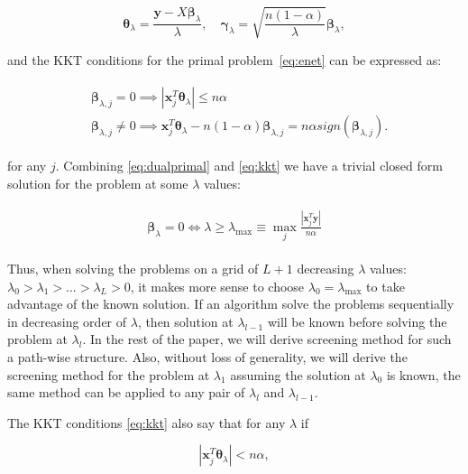\begin{equation}
    \label{eq:dualprimal}
    \boldsymbol\theta_\lambda=\frac{\boldsymbol y-X\boldsymbol\beta_\lambda}{\lambda},\quad \boldsymbol\gamma_\lambda=\sqrt{\frac{n(1-\alpha)}{\lambda}}\boldsymbol\beta_\lambda,
\end{equation}

and the KKT conditions for the primal problem~\eqref{eq:enet} can be expressed as:

\begin{gather}
    \label{eq:kkt}
    \begin{aligned}&\boldsymbol\beta_{\lambda,j}=0\implies|\boldsymbol x_j^T\boldsymbol\theta_\lambda|\leq n\alpha\\
    & \boldsymbol\beta_{\lambda,j}\neq0\implies  \boldsymbol x_j^T\boldsymbol\theta_\lambda-n(1-\alpha)\boldsymbol\beta_{\lambda,j}=n\alpha\textit{sign}(\boldsymbol\beta_{\lambda,j}).
    \end{aligned}
\end{gather}

for any $j$. Combining \eqref{eq:dualprimal} and \eqref{eq:kkt} we have a trivial closed form solution for the problem at some $\lambda$ values:

\begin{gather}
    \label{eq:lammax}
    \begin{aligned}
        \boldsymbol\beta_\lambda=0\iff \lambda \geq \lambda_{\max}\equiv \max_j \frac{|\boldsymbol x_j^T\boldsymbol y|}{n\alpha}
    \end{aligned}
\end{gather}

Thus, when solving the problems on a grid of $L+1$ decreasing $\lambda$ values: $\lambda_0>\lambda_1>...>\lambda_L>0$, it makes more sense to choose $\lambda_0= \lambda_{\max}$ to take advantage of the known solution. If an algorithm solve the problems sequentially in decreasing order of $\lambda$, then solution at $\lambda_{l-1}$ will be known before solving the problem at $\lambda_l$. In the rest of the paper, we will derive screening method for such a path-wise structure. Also, without loss of generality, we will derive the screening method for the problem at $\lambda_1$ assuming the solution at $\lambda_0$ is known, the same method can be applied to any pair of $\lambda_{l}$ and $\lambda_{l-1}$.

The KKT conditions \eqref{eq:kkt} also say that for any $\lambda$ if 

\begin{equation}
    \label{eq:disc_cond}
    |\boldsymbol x_j^T\boldsymbol\theta_{\lambda}|<n\alpha,
\end{equation}

